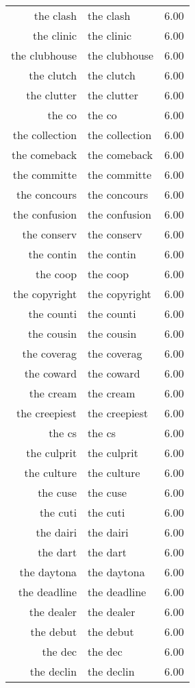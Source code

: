 \begin{table}[ht]
\begin{tabular}{rlr}
  the clash & the clash & 6.00 \\ 
  the clinic & the clinic & 6.00 \\ 
  the clubhouse & the clubhouse & 6.00 \\ 
  the clutch & the clutch & 6.00 \\ 
  the clutter & the clutter & 6.00 \\ 
  the co & the co & 6.00 \\ 
  the collection & the collection & 6.00 \\ 
  the comeback & the comeback & 6.00 \\ 
  the committe & the committe & 6.00 \\ 
  the concours & the concours & 6.00 \\ 
  the confusion & the confusion & 6.00 \\ 
  the conserv & the conserv & 6.00 \\ 
  the contin & the contin & 6.00 \\ 
  the coop & the coop & 6.00 \\ 
  the copyright & the copyright & 6.00 \\ 
  the counti & the counti & 6.00 \\ 
  the cousin & the cousin & 6.00 \\ 
  the coverag & the coverag & 6.00 \\ 
  the coward & the coward & 6.00 \\ 
  the cream & the cream & 6.00 \\ 
  the creepiest & the creepiest & 6.00 \\ 
  the cs & the cs & 6.00 \\ 
  the culprit & the culprit & 6.00 \\ 
  the culture & the culture & 6.00 \\ 
  the cuse & the cuse & 6.00 \\ 
  the cuti & the cuti & 6.00 \\ 
  the dairi & the dairi & 6.00 \\ 
  the dart & the dart & 6.00 \\ 
  the daytona & the daytona & 6.00 \\ 
  the deadline & the deadline & 6.00 \\ 
  the dealer & the dealer & 6.00 \\ 
  the debut & the debut & 6.00 \\ 
  the dec & the dec & 6.00 \\ 
  the declin & the declin & 6.00 \\ 

\end{tabular}
\end{table}
